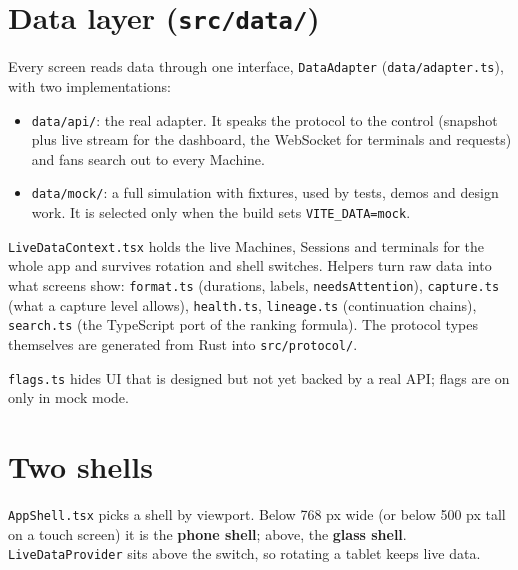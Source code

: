 \section{\texorpdfstring{Data layer (\texttt{src/\allowbreak{}data/\allowbreak{}})}{Data layer (src/data/)}}

Every screen reads data through one interface, \texttt{DataAdapter} (\texttt{data/\allowbreak{}adapter.\allowbreak{}ts}), with two implementations:

\begin{itemize}
\item \texttt{data/\allowbreak{}api/\allowbreak{}}: the real adapter. It speaks the protocol to the control (snapshot plus live stream for the dashboard, the WebSocket for terminals and requests) and fans search out to every Machine.
\item \texttt{data/\allowbreak{}mock/\allowbreak{}}: a full simulation with fixtures, used by tests, demos and design work. It is selected only when the build sets \texttt{VITE\_\allowbreak{}DATA=\allowbreak{}mock}.
\end{itemize}

\texttt{LiveDataContext.\allowbreak{}tsx} holds the live Machines, Sessions and terminals for the whole app and survives rotation and shell switches. Helpers turn raw data into what screens show: \texttt{format.\allowbreak{}ts} (durations, labels, \texttt{needsAttention}), \texttt{capture.\allowbreak{}ts} (what a capture level allows), \texttt{health.\allowbreak{}ts}, \texttt{lineage.\allowbreak{}ts} (continuation chains), \texttt{search.\allowbreak{}ts} (the TypeScript port of the ranking formula). The protocol types themselves are generated from Rust into \texttt{src/\allowbreak{}protocol/\allowbreak{}}.

\texttt{flags.\allowbreak{}ts} hides UI that is designed but not yet backed by a real API; flags are on only in mock mode.

\section{\texorpdfstring{Two shells}{Two shells}}

\texttt{AppShell.\allowbreak{}tsx} picks a shell by viewport. Below 768 px wide (or below 500 px tall on a touch screen) it is the \textbf{phone shell}; above, the \textbf{glass shell}. \texttt{LiveDataProvider} sits above the switch, so rotating a tablet keeps live data.

